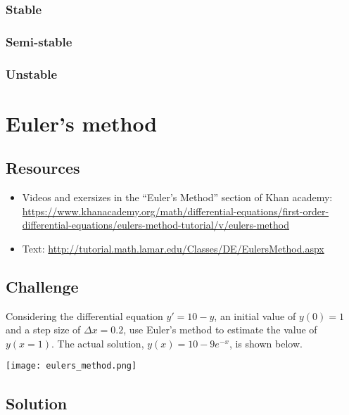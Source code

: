 \subsubsection*{Stable}
\six{}


\subsubsection*{Semi-stable}
\six{}


\subsubsection*{Unstable}
\six{}


\timebox



\newpage
\section{Euler's method}

\subsection*{Resources}
\begin{itemize}
    \item Videos and exersizes in the ``Euler's Method'' section of Khan academy: \url{https://www.khanacademy.org/math/differential-equations/first-order-differential-equations/eulers-method-tutorial/v/eulers-method}
    \item Text: \url{http://tutorial.math.lamar.edu/Classes/DE/EulersMethod.aspx}
\end{itemize}

\subsection*{Challenge}
Considering the differential equation $y'=10-y$, an initial value of $y(0)=1$ and a step size of $\Delta x = 0.2$, use Euler's method to estimate the value of $y(x=1)$. The actual solution, $y(x)=10-9e^{-x}$, is shown below.

\texttt{[image: eulers\_method.png]}

\subsection*{Solution}
\six{}

